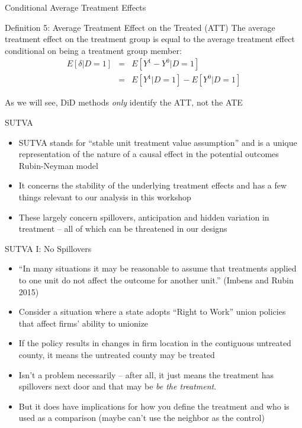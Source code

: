 \documentclass{beamer}
\begin{document}
\begin{frame}{Conditional Average Treatment Effects}	
	\begin{block}{Definition 5: Average Treatment Effect on the Treated (ATT)}
	The average treatment effect on the treatment group is equal to the average treatment effect conditional on being a treatment group member:
		\begin{eqnarray*}
		E[\delta|D=1]&=&E[Y^1-Y^0|D=1] \nonumber \\
		&=&E[Y^1|D=1]-E[Y^0|D=1]
		\end{eqnarray*}
	\end{block}
	
	\bigskip
	
As we will see, DiD methods \emph{only} identify the ATT, not the ATE
	
\end{frame}

\begin{frame}{SUTVA}

\begin{itemize}
\item SUTVA stands for ``stable unit treatment value assumption'' and is a unique representation of the nature of a causal effect in the potential outcomes Rubin-Neyman model
\item It concerns the stability of the underlying treatment effects and has a few things relevant to our analysis in this workshop
\item These largely concern spillovers, anticipation and hidden variation in treatment -- all of which can be threatened in our designs
\end{itemize}

\end{frame}

\begin{frame}{SUTVA I: No Spillovers}

\begin{itemize}
\item ``In many situations it may be reasonable to assume that treatments applied to one unit do not affect the outcome for another unit.'' (Imbens and Rubin 2015)
\item Consider a situation where a state adopts ``Right to Work'' union policies that affect firms' ability to unionize
\item If the policy results in changes in firm location in the contiguous untreated county, it means the untreated county may be treated
\item Isn't a problem necessarily -- after all, it just means the treatment has spillovers next door and that may be \emph{be the treatment}.
\item But it does have implications for how you define the treatment and who is used as a comparison (maybe can't use the neighbor as the control)
\end{itemize}

\end{frame}
\end{document}
